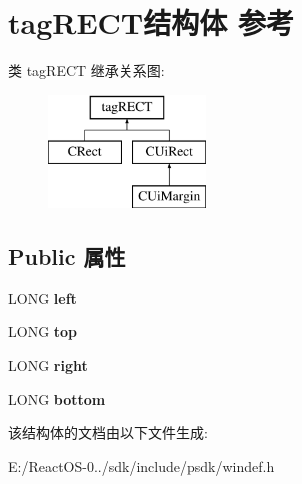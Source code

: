 \hypertarget{structtag_r_e_c_t}{}\section{tag\+R\+E\+C\+T结构体 参考}
\label{structtag_r_e_c_t}
类 tag\+R\+E\+CT 继承关系图\+:\begin{figure}[H]
\begin{center}
\leavevmode
\includegraphics[height=3.000000cm]{structtag_r_e_c_t}
\end{center}
\end{figure}
\subsection*{Public 属性}
\begin{DoxyCompactItemize}
\item 
\mbox{\label{structtag_r_e_c_t_aaeed612e6e2177660077dc9b12468ef1}} 
L\+O\+NG {\bfseries left}
\item 
\mbox{\label{structtag_r_e_c_t_a7ab865df87d10bf01215b3a6c044bcae}} 
L\+O\+NG {\bfseries top}
\item 
\mbox{\label{structtag_r_e_c_t_a42f2932b922f4de8b537c5b2229dc37f}} 
L\+O\+NG {\bfseries right}
\item 
\mbox{\label{structtag_r_e_c_t_a686a44f2dfa2c36711f35a61ecb84c6e}} 
L\+O\+NG {\bfseries bottom}
\end{DoxyCompactItemize}


该结构体的文档由以下文件生成\+:\begin{DoxyCompactItemize}
\item 
E\+:/\+React\+O\+S-\/0../sdk/include/psdk/windef.\+h\end{DoxyCompactItemize}
